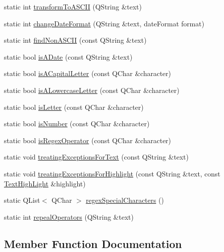 \begin{DoxyCompactItemize}
\item 
static int \hyperlink{class_string_manipulator_ae91d0a9b920ae7621a9d49bc2286235a}{transform\+To\+A\+S\+C\+II} (Q\+String \&text)
\item 
static int \hyperlink{class_string_manipulator_ac35afff547abbd79b54b514e2d752a71}{change\+Date\+Format} (Q\+String \&text, date\+Format format)
\item 
static int \hyperlink{class_string_manipulator_a9a6742faa577c63df0725af492b785f7}{find\+Non\+A\+S\+C\+II} (const Q\+String \&text)
\item 
static bool \hyperlink{class_string_manipulator_af0ba293accd9ddf0b7db3973edaa093f}{is\+A\+Date} (const Q\+String \&text)
\item 
static bool \hyperlink{class_string_manipulator_abfc77e41e2b96d37e07fa87cb71bd6da}{is\+A\+Capital\+Letter} (const Q\+Char \&character)
\item 
static bool \hyperlink{class_string_manipulator_a7c6339b8e0f43102fd4b8505fca0530d}{is\+A\+Lowercase\+Letter} (const Q\+Char \&character)
\item 
static bool \hyperlink{class_string_manipulator_a7deb1f37fd0efd4eddfb4cef8ed6eca6}{is\+Letter} (const Q\+Char \&character)
\item 
static bool \hyperlink{class_string_manipulator_af3dc83218b174085453f06453b93d17b}{is\+Number} (const Q\+Char \&character)
\item 
static bool \hyperlink{class_string_manipulator_a51dc44388aac908904aa0408e73ab615}{is\+Regex\+Operator} (const Q\+Char \&character)
\item 
static void \hyperlink{class_string_manipulator_a1bb8e6892955d05c68d523b985bad0bc}{treating\+Exceptions\+For\+Text} (const Q\+String \&text)
\item 
static void \hyperlink{class_string_manipulator_a3892dd94b5a1f6c61736fb523bd6a3ab}{treating\+Exceptions\+For\+Highlight} (const Q\+String \&text, const \hyperlink{class_text_high_light}{Text\+High\+Light} \&highlight)
\item 
static Q\+List$<$ Q\+Char $>$ \hyperlink{class_string_manipulator_a5ac671799b00b71f236dcfb68077cdce}{regex\+Special\+Characters} ()
\item 
static int \hyperlink{class_string_manipulator_af2041957b6df343d55d1cd99719e0d16}{repeal\+Operators} (Q\+String \&text)
\end{DoxyCompactItemize}


\subsection{Member Function Documentation}
\mbox{\label{class_string_manipulator_ad5ff80ae462045bc6d8f2be32c0da4bb}} 
